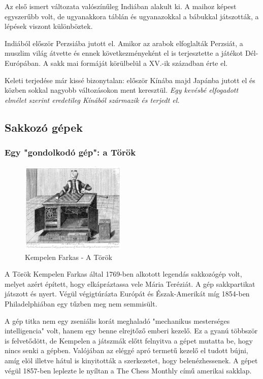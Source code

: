 \documentclass[twoside, a4paper, 12pt]{article}
\begin{document}
Az első ismert változata valószínűleg Indiában alakult ki. A maihoz képest egyszerűbb volt, de ugyanakkora táblán és ugyanazokkal a bábukkal játszották, a lépések viszont különböztek. 

Indiából először Perzsiába jutott el. Amikor az arabok elfoglalták Perzsiát, a muszlim világ átvette és ennek következményeként el is terjesztette a játékot Dél-Európában. A sakk mai formáját körülbelül a XV.-ik században érte el.

Keleti terjedése már kissé bizonytalan: először Kínába majd Japánba jutott el és közben sokkal nagyobb változásokon ment keresztül.
\textit{Egy kevésbé elfogadott elmélet szerint eredetileg Kínából származik és terjedt el.}\cite{HistoryOfChessHu}\cite{HistoryOfChessEn}

\subsection{Sakkozó gépek}
\subsubsection{Egy "gondolkodó gép": a Török}
\begin{figure}
	\caption{Kempelen Farkas - A Török}
	\label{fig:the_turk}
	\includegraphics[width=5.0cm]{img/the_turk}
\end{figure}
A Török Kempelen Farkas által 1769-ben alkotott legendás sakkozógép volt, melyet azért épített, hogy elkápráztassa vele Mária Teréziát. A gép sakkpartikat játszott és nyert. Végül végigtúrázta Európát és Észak-Amerikát míg 1854-ben Philadelphiában egy tűzben meg nem semmisült. 

A gép titka nem egy zseniális korát meghaladó "mechanikus mesterséges intelligencia" volt, hanem egy benne elrejtőző emberi kezelő. Ez a gyanú többször is felvetődött, de Kempelen a játszmák előtt felnyitva a gépet mutatta be, hogy nincs senki a gépben. Valójában az eléggé apró termetű kezelő el tudott bújni, amíg elöl illetve hátul is kinyitották a szerkezetet, hogy belenézhessenek. A gépet végül 1857-ben leplezte le nyíltan a The Chess Monthly című amerikai sakklap.\cite{MechanicalTurkHu}\cite{MechanicalTurkEn}\cite{CsodakKonyveHu}
\end{document}
